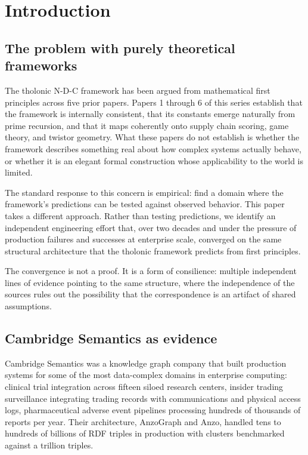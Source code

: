 \documentclass[12pt]{article}
\begin{document}
\section{Introduction}\label{introduction}

\subsection{The problem with purely theoretical frameworks}\label{the-problem-with-purely-theoretical-frameworks}

The tholonic N-D-C framework has been argued from mathematical first
principles across five prior papers. Papers 1 through 6 of this series
establish that the framework is internally consistent, that its
constants emerge naturally from prime recursion, and that it maps
coherently onto supply chain scoring, game theory, and twistor geometry.
What these papers do not establish is whether the framework describes
something real about how complex systems actually behave, or whether it
is an elegant formal construction whose applicability to the world is
limited.

The standard response to this concern is empirical: find a domain where
the framework's predictions can be tested against observed behavior.
This paper takes a different approach. Rather than testing predictions,
we identify an independent engineering effort that, over two decades and
under the pressure of production failures and successes at enterprise
scale, converged on the same structural architecture that the tholonic
framework predicts from first principles.

The convergence is not a proof. It is a form of consilience: multiple
independent lines of evidence pointing to the same structure, where the
independence of the sources rules out the possibility that the
correspondence is an artifact of shared assumptions.

\subsection{Cambridge Semantics as evidence}\label{cambridge-semantics-as-evidence}

Cambridge Semantics was a knowledge graph company that built production
systems for some of the most data-complex domains in enterprise
computing: clinical trial integration across fifteen siloed research
centers, insider trading surveillance integrating trading records with
communications and physical access logs, pharmaceutical adverse event
pipelines processing hundreds of thousands of reports per year. Their
architecture, AnzoGraph and Anzo, handled tens to hundreds of billions
of RDF triples in production with clusters benchmarked against a
trillion triples.
\end{document}
